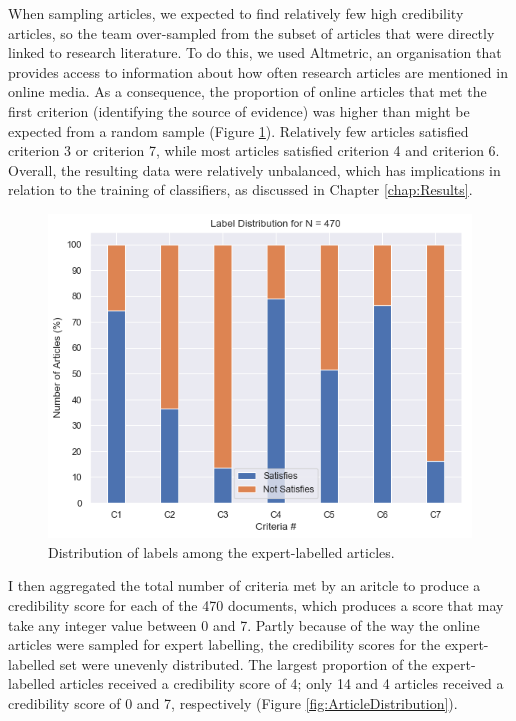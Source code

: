 \documentclass[a4paper,twoside,phd]{BYUPhys}
\begin{document}
When sampling articles, we expected to find relatively few high credibility articles, so the team over-sampled from the subset of articles that were directly linked to research literature. To do this, we used Altmetric, an organisation that provides access to information about how often research articles are mentioned in online media. As a consequence, the proportion of online articles that met the first criterion (identifying the source of evidence) was higher than might be expected from a random sample (Figure \ref{fig:LabelDistribution}). Relatively few articles satisfied criterion 3 or criterion 7, while most articles satisfied criterion 4 and criterion 6. Overall, the resulting data were relatively unbalanced, which has implications in relation to the training of classifiers, as discussed in Chapter \ref{chap:Results}.


\begin{figure}[H]
	\centering
	\includegraphics[totalheight=7cm]{images/label-distribution.png}
	\caption{Distribution of labels among the expert-labelled articles.}
	\label{fig:LabelDistribution}
\end{figure}


I then aggregated the total number of criteria met by an aritcle to produce a credibility score for each of the 470 documents, which produces a score that may take any integer value between 0 and 7. Partly because of the way the online articles were sampled for expert labelling, the credibility scores for the expert-labelled set were unevenly distributed. The largest proportion of the expert-labelled articles received a credibility score of 4; only 14 and 4 articles received a credibility score of 0 and 7, respectively (Figure \ref{fig:ArticleDistribution}).
\end{document}

